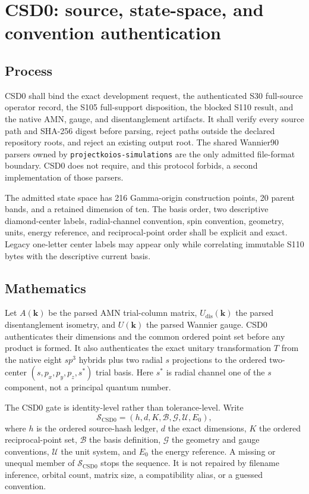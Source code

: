 \documentclass[11pt]{report}
\begin{document}
\chapter{CSD0: source, state-space, and convention authentication}

\section{Process}

CSD0 shall bind the exact development request, the authenticated S30 full-source
operator record, the S105 full-support disposition, the blocked S110 result, and the
native AMN, gauge, and disentanglement artifacts.  It shall verify every source path and
SHA-256 digest before parsing, reject paths outside the declared repository roots, and
reject an existing output root.  The shared Wannier90 parsers owned by
\texttt{projectkoios-simulations} are the only admitted file-format boundary.  CSD0 does
not require, and this protocol forbids, a second implementation of those parsers.

The admitted state space has 216 Gamma-origin construction points, 20 parent bands, and
a retained dimension of ten.  The basis order, two descriptive diamond-center labels,
radial-channel convention, spin convention, geometry, units, energy reference, and
reciprocal-point order shall be explicit and exact.  Legacy one-letter center labels may
appear only while correlating immutable S110 bytes with the descriptive current basis.

\section{Mathematics}

Let $A(\mathbf{k})$ be the parsed AMN trial-column matrix,
$U_{\mathrm{dis}}(\mathbf{k})$ the parsed disentanglement isometry, and
$U(\mathbf{k})$ the parsed Wannier gauge.  CSD0 authenticates their dimensions and the
common ordered point set before any product is formed.  It also authenticates the exact
unitary transformation $T$ from the native eight $sp^3$ hybrids plus two radial
$s$ projections to the ordered two-center
$(s,p_x,p_y,p_z,s^*)$ trial basis.  Here $s^*$ is radial channel one of the $s$
component, not a principal quantum number.

The CSD0 gate is identity-level rather than tolerance-level.  Write
\begin{equation}
 \mathcal{S}_{\mathrm{CSD0}}=(h,d,K,\mathcal{B},\mathcal{G},\mathcal{U},E_0),
\end{equation}
where $h$ is the ordered source-hash ledger, $d$ the exact dimensions, $K$ the ordered
reciprocal-point set, $\mathcal{B}$ the basis definition, $\mathcal{G}$ the geometry and
gauge conventions, $\mathcal{U}$ the unit system, and $E_0$ the energy reference.  A
missing or unequal member of $\mathcal{S}_{\mathrm{CSD0}}$ stops the sequence.  It is
not repaired by filename inference, orbital count, matrix size, a compatibility alias,
or a guessed convention.
\end{document}
